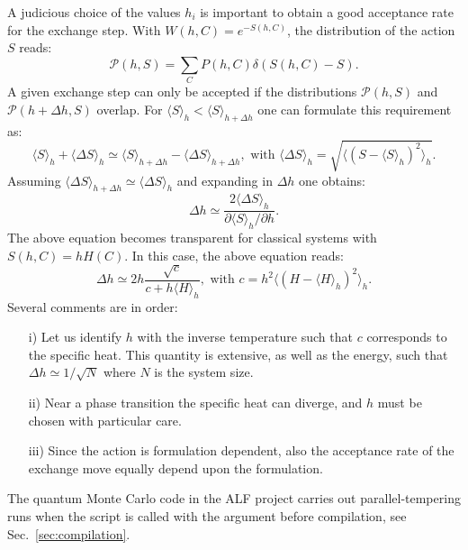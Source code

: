 A judicious choice of the values $h_i$ is important to obtain a good acceptance rate for the exchange step.  With  $W(h,C)  = e^{- S(h,C) }$, the  distribution of the action $S$  reads:
\begin{equation}
	 \mathcal{P}( h, S ) =   \sum_{C}     P( h,C )   \delta ( S(h,C) -  S ). 
\end{equation}
A given exchange step can only be accepted if the distributions $\mathcal{P}(h,S)$ and $\mathcal{P}(h+\Delta h, S)$ overlap. For 
$\langle S \rangle_{h}  < \langle S \rangle_{h +  \Delta h} $   one can formulate this  requirement as:
\begin{equation}
	\langle S \rangle_{h}  +\langle \Delta S \rangle_{h}   \simeq \langle S \rangle_{h +  \Delta h}  - \langle \Delta S \rangle_{h + \Delta h} ,  \text{    with   }   
\langle \Delta S \rangle_{h}   =  \sqrt{ \langle \left(    S -  \langle S   \rangle_h  	\right)^2 \rangle_h} .
\end{equation}
Assuming  $ \langle \Delta S \rangle_{h + \Delta h}  \simeq \langle \Delta S \rangle_{h} $  and expanding in $\Delta h$ one obtains: 
\begin{equation}
	\Delta h \simeq \frac{ 2  \langle \Delta S \rangle_{h}    }{ \partial \langle S \rangle_{h} / \partial h}.  
\end{equation} 
The above equation becomes transparent  for  classical systems  with $ S(h,C) =  h H(C) $.  In this case, the above equation reads: 
\begin{equation}
	\Delta h       \simeq  2 h \frac{  \sqrt{c} } { c  + h \langle H \rangle_h},  \text{   with  } c = h^2    \langle \left(  H -  \langle H   \rangle_h \right)^2 \rangle_h .
\end{equation} 
Several comments are in order:
\begin{itemize}
\item[i)] Let us identify $h$ with the inverse temperature  such that $c$ corresponds to the specific heat. This quantity is extensive,  as well as the energy, such that $ \Delta h \simeq 1/{\sqrt{N}} $ where $N$ is the system size.
\item[ii)] Near a phase transition the specific heat can diverge, and $h$ must be chosen with particular care.
\item[iii)]  Since the action is formulation dependent, also the acceptance rate of the exchange move equally depend  upon the formulation. 
\end{itemize}
The quantum Monte Carlo code in the ALF project carries out parallel-tempering runs when the script  is called with the argument  before compilation, see Sec.~\ref{sec:compilation}.
